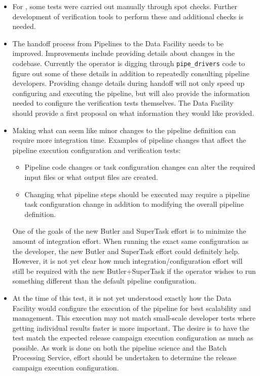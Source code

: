 \documentclass[DM,lsstdraft,STR,toc]{lsstdoc}
\begin{document}
\begin{itemize}

  \item{
    For \milestoneId{}, some tests were carried out manually through spot checks.
    Further development of verification tools to perform these and additional checks is needed.
  }

  \item{
    The handoff process from Pipelines to the Data Facility needs to be improved.
    Improvements include providing details about changes in the codebase.
    Currently the operator is digging through \texttt{pipe{\_}drivers} code to figure out some of these details in addition to repeatedly consulting pipeline developers.
    Providing change details during handoff will not only speed up configuring and executing the pipeline, but will also provide the information needed to configure the verification tests themselves.
    The Data Facility should provide a first proposal on what information they would like provided.
  }

  \item{
    Making what can seem like minor changes to the pipeline definition can require more integration time.
    Examples of pipeline changes that affect the pipeline execution configuration and verification tests:

    \begin{itemize}

      \item{Pipeline code changes or task configuration changes can alter the required input files or what output files are created.}
      \item{Changing what pipeline steps should be executed may require a pipeline task configuration change in addition to modifying the overall pipeline definition.}

    \end{itemize}

    One of the goals of the new Butler and SuperTask effort is to minimize the amount of integration effort.
    When running the exact same configuration as the developer, the new Butler and SuperTask effort could definitely help.
    However, it is not yet clear how much integration/configuration effort will still be required with the new Butler+SuperTask if the operator wishes to run something different than the default pipeline configuration.
  }

  \item{
    At the time of this test, it is not yet understood exactly how the Data Facility would configure the execution of the pipeline for best scalability and management.
    This execution may not match small-scale developer tests where getting individual results faster is more important.
    The desire is to have the test match the expected release campaign execution configuration
  as much as possible.
    As work is done on both the pipeline science and the Batch Processing Service, effort should be undertaken to determine the release campaign execution configuration.
  }

\end{itemize}
\end{document}
